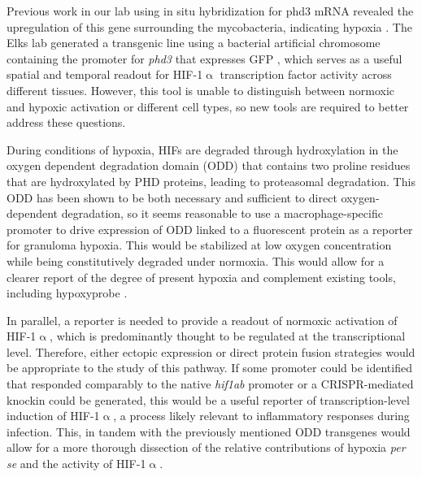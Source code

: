 Previous work in our lab using in situ hybridization for phd3 mRNA revealed the upregulation of this gene surrounding the mycobacteria, indicating hypoxia \citep{Oehlers2015}. The Elks lab generated a transgenic line using a bacterial artificial chromosome containing the promoter for \textit{phd3} that expresses GFP \citep{Santhakumar2012}, which serves as a useful spatial and temporal readout for HIF-1$\upalpha$ transcription factor activity across different tissues. However, this tool is unable to distinguish between normoxic and hypoxic activation or different cell types, so new tools are required to better address these questions.

During conditions of hypoxia, HIFs are degraded through hydroxylation in the oxygen dependent degradation domain (ODD) that contains two proline residues that are hydroxylated by PHD proteins, leading to proteasomal degradation. This ODD has been shown to be both necessary and sufficient to direct oxygen-dependent degradation, so it seems reasonable to use a macrophage-specific promoter to drive expression of ODD linked to a fluorescent protein as a reporter for granuloma hypoxia. This would be stabilized at low oxygen concentration while being constitutively degraded under normoxia. This would allow for a clearer report of the degree of present hypoxia and complement existing tools, including hypoxyprobe \citep{Cousins2016, Huang1998}.

In parallel, a reporter is needed to provide a readout of normoxic activation of HIF-1$\upalpha$, which is predominantly thought to be regulated at the transcriptional level. Therefore, either ectopic expression or direct protein fusion strategies would be appropriate to the study of this pathway. If some promoter could be identified that responded comparably to the native \textit{hif1ab} promoter or a CRISPR-mediated knockin could be generated, this would be a useful reporter of transcription-level induction of HIF-1$\upalpha$, a process likely relevant to inflammatory responses during infection.  This, in tandem with the previously mentioned ODD transgenes would allow for a more thorough dissection of the relative contributions of hypoxia \textit{per se} and the activity of HIF-1$\upalpha$.

